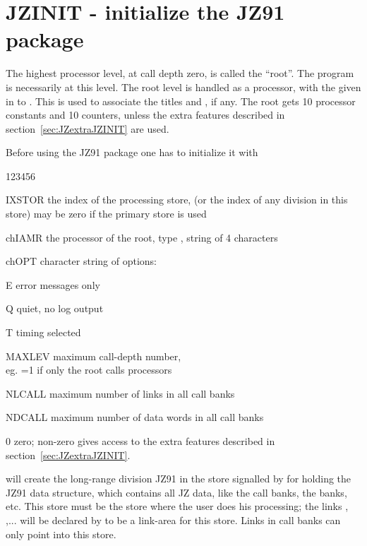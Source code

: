 \newpage
{}
\section{JZINIT - initialize the JZ91 package}

The highest processor level,
at call depth zero, is called the ``root''.
The  program is necessarily at this level.
The root level is handled as a processor,
with the  given in  to .
This is used to associate the titles  and , if any.
The root gets 10 processor constants and 10  counters,
unless the extra features described in 
section~\ref{sec:JZextraJZINIT} are used.

Before using the JZ91 package one has to initialize it with


\begin{DLtt}{123456}
\item[IXSTOR] the index of the processing store,
             (or the index of any division in this store)
             may be zero if the primary store is used
\item[chIAMR] the processor  of the root,
             type , string of 4 characters
\item[chOPT]  character string of options:
      \begin{DLtt}{1}
           \item[E]  error messages only
           \item[Q]  quiet, no log output
           \item[T]  timing selected
      \end{DLtt}
\item[MAXLEV] maximum call-depth number,\\
             eg. =1 if only the root calls processors
\item[NLCALL]  maximum number of links in all call banks
\item[NDCALL]  maximum number of data words in all call banks
\item[0]       zero; non-zero gives access to the extra features
                   described in section~\ref{sec:JZextraJZINIT}.
\end{DLtt}

 will create the long-range division JZ91 in the store
signalled by  for holding the JZ91 data structure,
which contains all JZ data, like the call banks, the  banks, etc.
This store must be the store where the user does his processing;
the links , ,... will be declared by 
 to be a link-area for this store.
Links in call banks can only point into this store.

